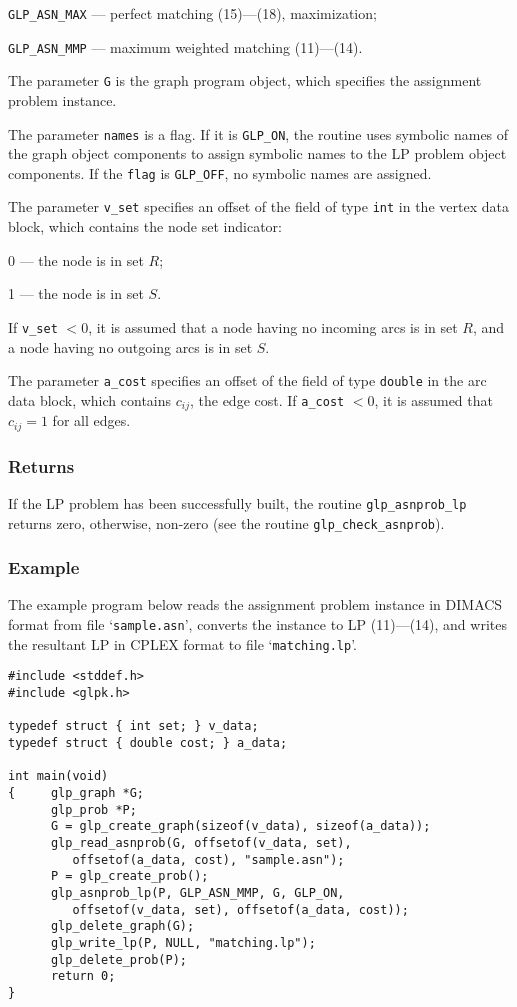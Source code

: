 \documentclass[dvipdfm,11pt]{report}
\begin{document}
\verb|GLP_ASN_MAX| --- perfect matching (15)---(18), maximization;

\verb|GLP_ASN_MMP| --- maximum weighted matching (11)---(14).

The parameter \verb|G| is the graph program object, which specifies the
assignment problem instance.

The parameter \verb|names| is a flag. If it is \verb|GLP_ON|, the
routine uses symbolic names of the graph object components to assign
symbolic names to the LP problem object components. If the \verb|flag|
is \verb|GLP_OFF|, no symbolic names are assigned.

The parameter \verb|v_set| specifies an offset of the field of type
\verb|int| in the vertex data block, which contains the node set
indicator:

0 --- the node is in set $R$;

1 --- the node is in set $S$.

\noindent
If \verb|v_set| $<0$, it is assumed that a node having no incoming arcs
is in set $R$, and a node having no outgoing arcs is in set $S$.

The parameter \verb|a_cost| specifies an offset of the field of type
\verb|double| in the arc data block, which contains $c_{ij}$, the edge
cost. If \verb|a_cost| $<0$, it is assumed that $c_{ij}=1$ for all
edges.

\subsubsection*{Returns}

If the LP problem has been successfully built, the routine
\verb|glp_asnprob_lp| returns zero, otherwise, non-zero (see the
routine \verb|glp_check_asnprob|).

\subsubsection*{Example}

The example program below reads the assignment problem instance in
DIMACS format from file `\verb|sample.asn|', converts the instance to
LP (11)---(14), and writes the resultant LP in CPLEX format to file
`\verb|matching.lp|'.

\begin{footnotesize}
\begin{verbatim}
#include <stddef.h>
#include <glpk.h>

typedef struct { int set; } v_data;
typedef struct { double cost; } a_data;

int main(void)
{     glp_graph *G;
      glp_prob *P;
      G = glp_create_graph(sizeof(v_data), sizeof(a_data));
      glp_read_asnprob(G, offsetof(v_data, set),
         offsetof(a_data, cost), "sample.asn");
      P = glp_create_prob();
      glp_asnprob_lp(P, GLP_ASN_MMP, G, GLP_ON,
         offsetof(v_data, set), offsetof(a_data, cost));
      glp_delete_graph(G);
      glp_write_lp(P, NULL, "matching.lp");
      glp_delete_prob(P);
      return 0;
}
\end{verbatim}
\end{footnotesize}
\end{document}
